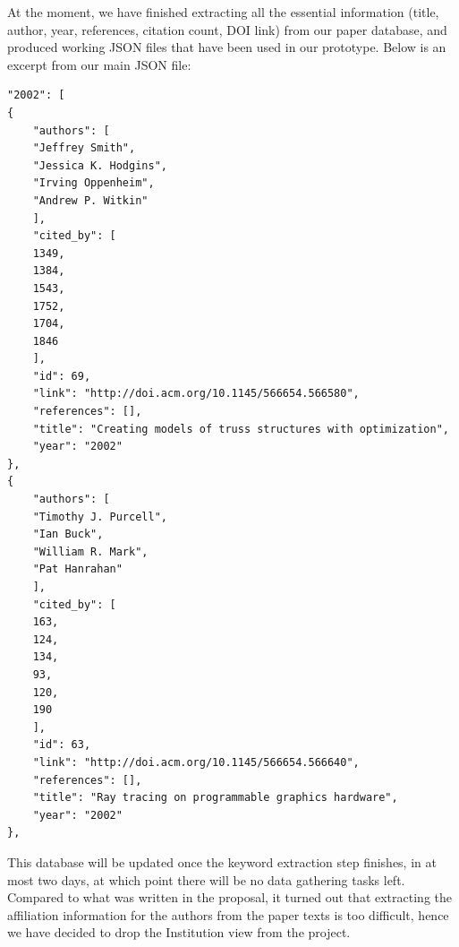 \documentclass[dvips,12pt]{article}
\begin{document}
At the moment, we have finished extracting all the essential information (title, author, year, references, citation count, DOI link) from our paper database, and produced working JSON files that have been used in our prototype. Below is an excerpt from our main JSON file:

\begin{lstlisting}
"2002": [
{
    "authors": [
    "Jeffrey Smith", 
    "Jessica K. Hodgins", 
    "Irving Oppenheim", 
    "Andrew P. Witkin"
    ], 
    "cited_by": [
    1349, 
    1384, 
    1543, 
    1752, 
    1704, 
    1846
    ], 
    "id": 69, 
    "link": "http://doi.acm.org/10.1145/566654.566580", 
    "references": [], 
    "title": "Creating models of truss structures with optimization", 
    "year": "2002"
}, 
{
    "authors": [
    "Timothy J. Purcell", 
    "Ian Buck", 
    "William R. Mark", 
    "Pat Hanrahan"
    ], 
    "cited_by": [
    163, 
    124, 
    134, 
    93, 
    120, 
    190
    ], 
    "id": 63, 
    "link": "http://doi.acm.org/10.1145/566654.566640", 
    "references": [], 
    "title": "Ray tracing on programmable graphics hardware", 
    "year": "2002"
}, 
\end{lstlisting}

This database will be updated once the keyword extraction step finishes, in at most two days, at which point there will be no data gathering tasks left. Compared to what was written in the proposal, it turned out that extracting the affiliation information for the authors from the paper texts is too difficult, hence we have decided to drop the Institution view from the project.
\end{document}
